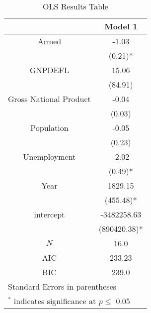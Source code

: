 
\begin{table}
\caption{OLS Results Table}
\center
\label{tab:ols}
\begin{center}
\begin{tabular}{c c}
\hline\hline   &     Model 1 \\
\hline
Armed   &   -1.03  \\  
                       &   (0.21)*  \\
                    GNPDEFL   &   15.06  \\  
                       &   (84.91)  \\
                    Gross National Product   &   -0.04  \\  
                       &   (0.03)  \\
                    Population   &   -0.05  \\  
                       &   (0.23)  \\
                    Unemployment   &   -2.02  \\  
                       &   (0.49)*  \\
                    Year   &   1829.15  \\  
                       &   (455.48)*  \\
                    intercept   &   -3482258.63  \\  
                       &   (890420.38)*  \\
                     
                    $N$     &    16.0 \\
                    AIC     &    233.23 \\
                    BIC     &    239.0 \\ \hline
                
\hline
\multicolumn{2}{l}{\footnotesize{Standard Errors in parentheses}}\\
\multicolumn{2}{l}{\footnotesize{$^*$ indicates significance at $p \le$ 0.05}}
\end{tabular}
\end{center}
\end{table}
                